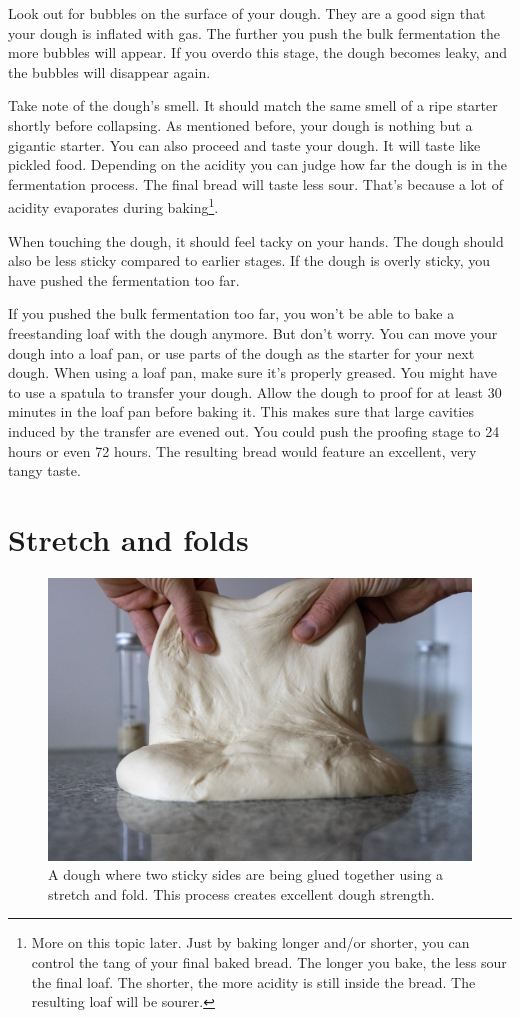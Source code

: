 Look out for bubbles on the surface of your dough. They
are a good sign that your dough is inflated with gas. The
further you push the bulk fermentation the more bubbles
will appear. If you overdo this stage, the dough becomes leaky, and
the bubbles will disappear again.

Take note of the dough's smell. It should match the same
smell of a ripe starter shortly before collapsing. As mentioned
before, your dough is nothing but a gigantic starter. You
can also proceed and taste your dough. It will taste like
pickled food. Depending on the acidity you can judge how
far the dough is in the fermentation process. The final bread
will taste less sour. That's because a lot of acidity evaporates
during baking\footnote{More on this topic later.
Just by baking longer and/or shorter, you can control
the tang of your final baked bread. The longer
you bake, the less sour the final loaf. The shorter,
the more acidity is still inside the bread. The resulting
loaf will be sourer.}.

When touching the dough, it should feel tacky
on your hands. The dough should also be less sticky
compared to earlier stages. If the dough is overly
sticky, you have pushed the fermentation too far.

If you pushed the bulk fermentation too far, you won't be able
to bake a freestanding loaf with the dough anymore. But don't
worry. You can move your dough into a loaf pan, or use parts
of the dough as the starter for your next dough. When using
a loaf pan, make sure it's properly greased. You might have
to use a spatula to transfer your dough. Allow the dough
to proof for at least 30 minutes in the loaf pan before
baking it. This makes sure that large cavities induced
by the transfer are evened out. You could push the proofing
stage to 24 hours or even 72 hours. The resulting
bread would feature an excellent, very tangy taste.


\section{Stretch and folds}

\begin{figure}[!htb]
  \includegraphics[width=\textwidth]{dough-being-glued}
  \caption{A dough where two sticky sides are being glued together using
  a stretch and fold. This process creates excellent dough strength.}
\end{figure}


